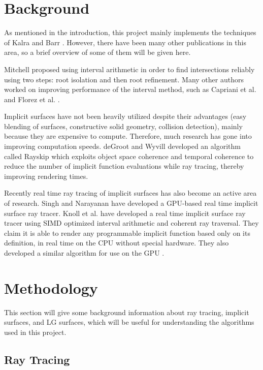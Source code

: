 \documentclass[conference]{acmsiggraph}
\begin{document}
\section{Background}

As mentioned in the introduction, this project mainly implements the
techniques of Kalra and Barr \cite{KalraBarr1989}.  However, there have
been many other publications in this area, so a brief overview of some
of them will be given here.

Mitchell \cite{MitchellIntervals} proposed using interval arithmetic 
in order to find intersections reliably using two steps: root isolation
and then root refinement.  Many other authors worked on improving
performance of the interval method, such as Capriani et al. \cite{CaprianiIntervals} and
Florez et al. \cite{FlorezIntervals}.

Implicit surfaces have not been heavily utilized despite their advantages
(easy blending of surfaces, constructive solid geometry, collision detection),
mainly because they are expensive to compute.  Therefore, much research
has gone into improving computation speeds.  deGroot and Wyvill
\cite{deGrootWyvill} developed an algorithm called Rayskip which
exploits object space coherence and temporal coherence to reduce the
number of implicit function evaluations while ray tracing, thereby
improving rendering times.

Recently real time ray tracing of implicit surfaces has also become an active
area of research.  Singh and Narayanan \cite{RealTimeGPU} 
have developed a GPU-based real time implicit surface ray tracer.
Knoll et al. \cite{RealTimeIntervals} have developed 
a real time implicit surface ray tracer using SIMD optimized interval 
arithmetic and coherent ray traversal.  They claim it is able to
render any programmable implicit function based only on its definition,
in real time on the CPU without special hardware.  They also developed
a similar algorithm for use on the GPU \cite{RealTimeIntervals2}.

\section{Methodology}

This section will give some background information about ray tracing,
implicit surfaces, and LG surfaces, which will be useful for 
understanding the algorithms used in this project.

\subsection{Ray Tracing}
\end{document}
